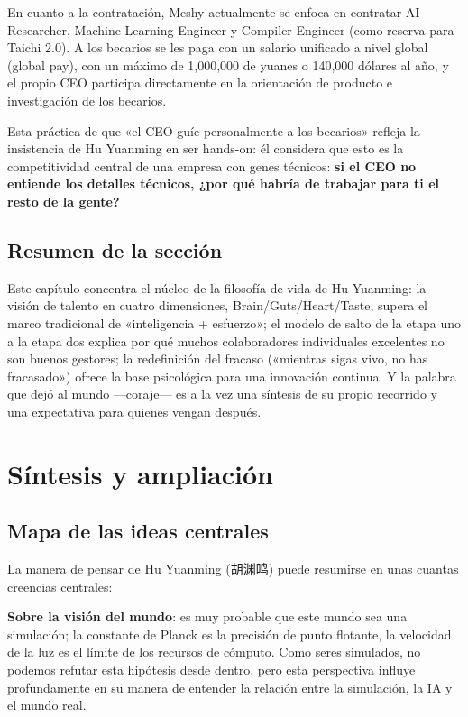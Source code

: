 \documentclass[a4paper]{article}
\begin{document}
En cuanto a la contratación, Meshy actualmente se enfoca en contratar AI Researcher, Machine Learning Engineer y Compiler Engineer (como reserva para Taichi 2.0). A los becarios se les paga con un salario unificado a nivel global (global pay), con un máximo de 1,000,000 de yuanes o 140,000 dólares al año, y el propio CEO participa directamente en la orientación de producto e investigación de los becarios.

Esta práctica de que «el CEO guíe personalmente a los becarios» refleja la insistencia de Hu Yuanming en ser hands-on: él considera que esto es la competitividad central de una empresa con genes técnicos: \textbf{si el CEO no entiende los detalles técnicos, ¿por qué habría de trabajar para ti el resto de la gente?}

\subsection{Resumen de la sección}

Este capítulo concentra el núcleo de la filosofía de vida de Hu Yuanming: la visión de talento en cuatro dimensiones, Brain/Guts/Heart/Taste, supera el marco tradicional de «inteligencia + esfuerzo»; el modelo de salto de la etapa uno a la etapa dos explica por qué muchos colaboradores individuales excelentes no son buenos gestores; la redefinición del fracaso («mientras sigas vivo, no has fracasado») ofrece la base psicológica para una innovación continua. Y la palabra que dejó al mundo —coraje— es a la vez una síntesis de su propio recorrido y una expectativa para quienes vengan después.
\section{Síntesis y ampliación}

\subsection{Mapa de las ideas centrales}

La manera de pensar de Hu Yuanming (胡渊鸣) puede resumirse en unas cuantas creencias centrales:

\textbf{Sobre la visión del mundo}: es muy probable que este mundo sea una simulación; la constante de Planck es la precisión de punto flotante, la velocidad de la luz es el límite de los recursos de cómputo. Como seres simulados, no podemos refutar esta hipótesis desde dentro, pero esta perspectiva influye profundamente en su manera de entender la relación entre la simulación, la IA y el mundo real.
\end{document}
